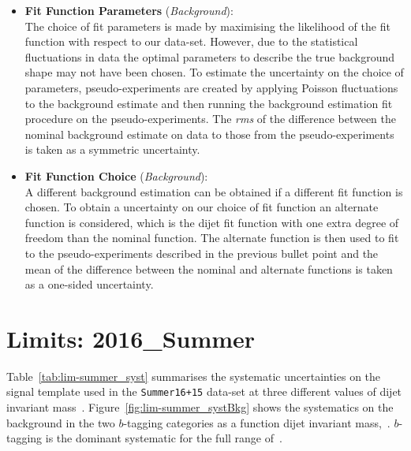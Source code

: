 \begin{itemize}[leftmargin=*]
\item \textbf{Fit Function Parameters} \hspace{1mm} (\textit{Background}):\\
  The choice of fit parameters is made by maximising the likelihood of the fit function with respect to our data-set.
  However, due to the statistical fluctuations in data the optimal parameters to describe
  the true background shape may not have been chosen.
  To estimate the uncertainty on the choice of parameters, pseudo-experiments are created by applying Poisson
  fluctuations to the background estimate and then running the background estimation fit procedure on the pseudo-experiments.
  The \textit{rms} of the difference between the nominal background estimate on data to those from the pseudo-experiments is
  taken as a symmetric uncertainty. \vspace{0.5em}
\item\textbf{Fit Function Choice}  \hspace{1mm} (\textit{Background}):\\
  A different background estimation can be obtained if a different fit function is chosen.
  To obtain a uncertainty on our choice of fit function an alternate function is considered,
  which is the dijet fit function with one extra degree of freedom than the nominal function.
  The alternate function is then used to fit to the pseudo-experiments described in the previous bullet point
  and the mean of the difference between the nominal and alternate functions is taken as a one-sided uncertainty.
  \vspace{0.5em}
\end{itemize}

\section{Limits: 2016\_Summer}
\label{sec:lim-summer}

Table~\ref{tab:lim-summer_syst} summarises the systematic uncertainties
on the signal template used in the \verb|Summer16+15| data-set at
three different values of dijet invariant mass~\mjj.
Figure~\ref{fig:lim-summer_systBkg} shows the systematics on the background
in the two $b$-tagging categories as a function dijet invariant mass,~\mjj.
$b$-tagging is the dominant systematic for the full range of~\mjj.

